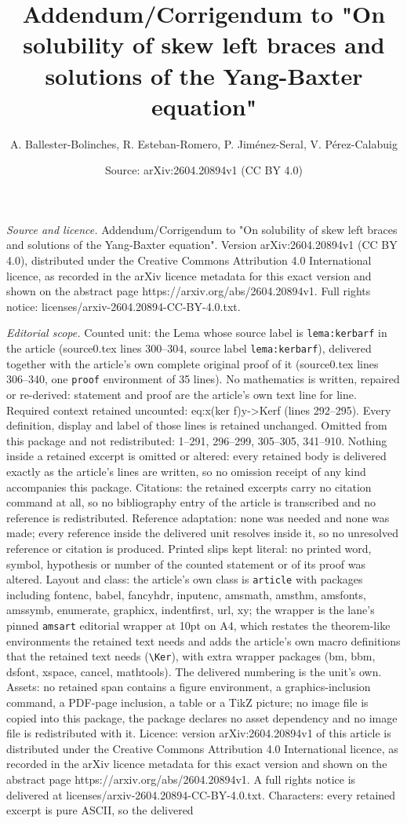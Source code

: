 \documentclass[10pt,a4paper]{amsart}
\title[Addendum/Corrigendum to "On solubility of skew left braces a]{Addendum/Corrigendum to "On solubility of skew left braces and solutions of the Yang-Baxter equation"}
\author{A. Ballester-Bolinches, R. Esteban-Romero, P. Jim\'enez-Seral, V. P\'erez-Calabuig}
\date{Source: arXiv:2604.20894v1 (CC BY 4.0)}
\begin{document}
\maketitle

\noindent\emph{Source and licence.} Addendum/Corrigendum to "On solubility of skew left braces and solutions of the Yang-Baxter equation". Version arXiv:2604.20894v1 (CC BY 4.0), distributed under the Creative Commons Attribution 4.0 International licence, as recorded in the arXiv licence metadata for this exact version and shown on the abstract page https://arxiv.org/abs/2604.20894v1. Full rights notice: licenses/arxiv-2604.20894-CC-BY-4.0.txt.\par\smallskip

\noindent\textit{Editorial scope.} Counted unit: the Lema whose source label is \texttt{lema:kerbarf} in the article (source0.tex lines 300--304, source label \texttt{lema:kerbarf}), delivered together with the article's own complete original proof of it (source0.tex lines 306--340, one \texttt{proof} environment of 35 lines). No mathematics is written, repaired or re-derived: statement and proof are the article's own text line for line. Required context retained uncounted: eq:x(ker f)y->Kerf (lines 292--295). Every definition, display and label of those lines is retained unchanged. Omitted from this package and not redistributed: 1--291, 296--299, 305--305, 341--910. Nothing inside a retained excerpt is omitted or altered: every retained body is delivered exactly as the article's lines are written, so no omission receipt of any kind accompanies this package. Citations: the retained excerpts carry no citation command at all, so no bibliography entry of the article is transcribed and no reference is redistributed. Reference adaptation: none was needed and none was made; every reference inside the delivered unit resolves inside it, so no unresolved reference or citation is produced. Printed slips kept literal: no printed word, symbol, hypothesis or number of the counted statement or of its proof was altered. Layout and class: the article's own class is \texttt{article} with packages including fontenc, babel, fancyhdr, inputenc, amsmath, amsthm, amsfonts, amssymb, enumerate, graphicx, indentfirst, url, xy; the wrapper is the lane's pinned \texttt{amsart} editorial wrapper at 10pt on A4, which restates the theorem-like environments the retained text needs and adds the article's own macro definitions that the retained text needs (\texttt{\textbackslash Ker}), with extra wrapper packages (bm, bbm, dsfont, xspace, cancel, mathtools). The delivered numbering is the unit's own. Assets: no retained span contains a figure environment, a graphics-inclusion command, a PDF-page inclusion, a table or a TikZ picture; no image file is copied into this package, the package declares no asset dependency and no image file is redistributed with it. Licence: version arXiv:2604.20894v1 of this article is distributed under the Creative Commons Attribution 4.0 International licence, as recorded in the arXiv licence metadata for this exact version and shown on the abstract page https://arxiv.org/abs/2604.20894v1. A full rights notice is delivered at licenses/arxiv-2604.20894-CC-BY-4.0.txt. Characters: every retained excerpt is pure ASCII, so the delivered 
\end{document}
